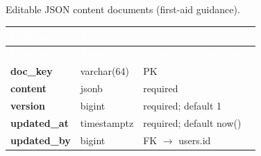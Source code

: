 \subsection*{}
Editable JSON content documents (first-aid guidance).\par\vspace{2pt}
{\tabfont\rowband
\begin{longtable}{@{}>{\raggedright\arraybackslash}p{}>{\raggedright\arraybackslash}p{}>{\raggedright\arraybackslash}p{}@{}}
\rowcolor{najdanavy}\textcolor{white}{\sffamily\bfseries\small Column} & \textcolor{white}{\sffamily\bfseries\small Type} & \textcolor{white}{\sffamily\bfseries\small Constraints and notes}\\
\endfirsthead
\rowcolor{najdanavy}\textcolor{white}{\sffamily\bfseries\small Column} & \textcolor{white}{\sffamily\bfseries\small Type} & \textcolor{white}{\sffamily\bfseries\small Constraints and notes}\\
\endhead
\bottomrule\endlastfoot
\textbf{doc\_\allowbreak{}key} & varchar(64) & PK\\
\textbf{content} & jsonb & required\\
\textbf{version} & bigint & required; default 1\\
\textbf{updated\_\allowbreak{}at} & timestamptz & required; default now()\\
\textbf{updated\_\allowbreak{}by} & bigint & FK $\rightarrow$ users.id\\
\end{longtable}}

